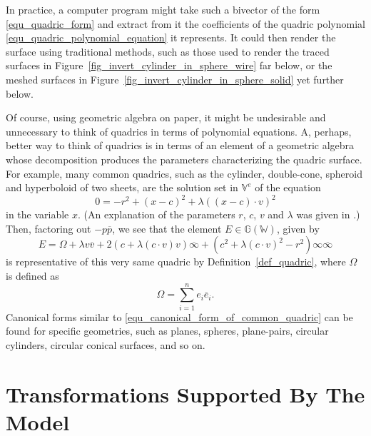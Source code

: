\documentclass{birkjour}
\theoremstyle{definition}
\theoremstyle{remark}
\numberwithin{equation}{section}
\newcommand{\G}{\mathbb{G}}
\newcommand{\V}{\mathbb{V}}
\newcommand{\W}{\mathbb{W}}
\newcommand{\nvai}{\infty}
\newcommand{\nvaib}{\overline{\infty}}
\begin{document}
In practice, a computer program might take such a bivector of the form \eqref{equ_quadric_form}
and extract from it the coefficients of the quadric
polynomial \eqref{equ_quadric_polynomial_equation} it
represents.  It could then render the surface using traditional methods, such as those used
to render the traced surfaces in Figure~\ref{fig_invert_cylinder_in_sphere_wire} far below,
or the meshed surfaces in Figure~\ref{fig_invert_cylinder_in_sphere_solid} yet further below.

Of course, using geometric algebra on paper, it might be undesirable and unnecessary to think of
quadrics in terms of polynomial equations.  A, perhaps, better way to think of quadrics is in terms
of an element of a geometric algebra whose decomposition
produces the parameters characterizing the quadric surface.  For example, many common
quadrics, such as the cylinder, double-cone, spheroid and hyperboloid of two sheets, are the
solution set in $\V^e$ of the equation
\begin{equation}
0 = -r^2 + (x-c)^2 + \lambda((x-c)\cdot v)^2
\end{equation}
in the variable $x$.  (An explanation of the parameters $r$, $c$, $v$ and $\lambda$
was given in \cite{Parkin12}.)  Then, factoring out $-p\overline{p}$, we see that
the element $E\in\G(\W)$, given by
\begin{equation}\label{equ_canonical_form_of_common_quadric}
E=\Omega + \lambda v\overline{v}+2(c+\lambda(c\cdot v)v)\nvaib+
(c^2+\lambda (c\cdot v)^2-r^2)\nvai\nvaib
\end{equation}
is representative of this very same quadric by Definition~\ref{def_quadric},
where $\Omega$ is defined as
\begin{equation}
\Omega = \sum_{i=1}^n e_i\overline{e}_i.
\end{equation}
Canonical forms similar to \eqref{equ_canonical_form_of_common_quadric}
can be found for specific geometries, such as planes, spheres, plane-pairs,
circular cylinders, circular conical surfaces, and so on.

\section{Transformations Supported By The Model}
\end{document}
